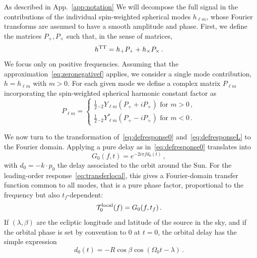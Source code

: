 \documentclass[aps,showpacs,twocolumn,
prd,superscriptaddress,nofootinbib]{revtex4-1}
\newcommand{\be}{\begin{equation}}
\newcommand{\ee}{\end{equation}}
\newcommand\calT{{\mathcal{T}}}
\newcommand{\hatk}{k}
\newcommand{\tf}{t_{f}}
\begin{document}
As described in App.~\ref{app:notation} We will decompose the full signal in the contributions of the individual spin-weighted spherical modes $h_{\ell m}$, whose Fourier transforms are assumed to have a smooth amplitude and phase. First, we define the matrices $P_{+},P_{\times}$ such that, in the sense of matrices,
\be
	h^{\rm TT} = h_{+}P_{+} + h_{\times}P_{\times} \,.
\ee
We focus only on positive frequencies. Assuming that the approximation~\eqref{eq:zeronegativef} applies, we consider a single mode contribution, $h=h_{\ell m}$ with $m>0$. For each given mode we define a complex matrix $P_{\ell m}$ incorporating the spin-weighted spherical harmonic constant factor as
\be
	P_{\ell m} = 
	\begin{cases} 
	\frac{1}{2} {}_{-2}Y_{\ell m} \left( P_{+} + i P_{\times} \right) \text{ for } m>0\,,\\
	\frac{1}{2} {}_{-2}Y_{\ell m}^{*} \left( P_{+} - i P_{\times} \right) \text{ for } m<0\,.
	\end{cases}
\ee

We now turn to the transformation of~\eqref{eq:defresponse0} and~\eqref{eq:defresponseL} to the Fourier domain. Applying a pure delay as in~\eqref{eq:defresponse0} translates into
\be\label{eq:G0}
	G_{0}(f, t) = e^{-2i\pi f d_{0}(t)} \,,
\ee
with $d_{0} = -\hatk \cdot p_{0}$ the delay associated to the orbit around the Sun. For the leading-order response~\eqref{eq:transferlocal}, this gives a Fourier-domain transfer function common to all modes, that is a pure phase factor, proportional to the frequency but also $t_{f}$-dependent:
\be\label{eq:transfer0local}
	\calT_{0}^{\rm local}(f) = G_{0}(f, \tf)\,.
\ee
If $(\lambda, \beta)$ are the ecliptic longitude and latitude of the source in the sky, and if the orbital phase is set by convention to $0$ at $t=0$, the orbital delay has the simple expression
\be\label{eq:delay0}
	d_{0}(t) = -R \cos\beta \cos\left(\Omega_{0}t - \lambda\right)\,.
\ee
\end{document}
